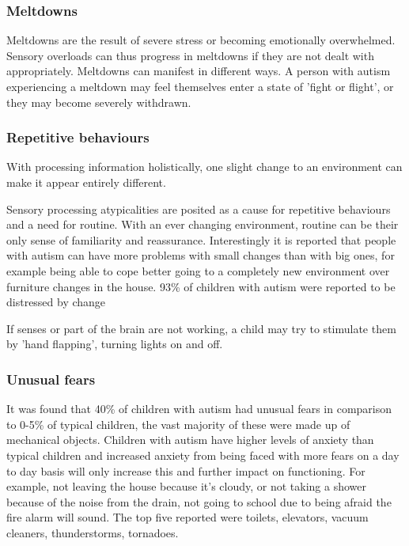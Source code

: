 \documentclass[11pt]{report}
\begin{document}
\subsubsection{Meltdowns}
Meltdowns are the result of severe stress or becoming emotionally overwhelmed. Sensory overloads can thus progress in meltdowns if they are not dealt with appropriately. Meltdowns can manifest in different ways. A person with autism experiencing a meltdown may feel themselves enter a state of 'fight or flight', or they may become severely withdrawn.

\subsubsection{Repetitive behaviours}

With processing information holistically, one slight change to an environment can make it appear entirely different.

Sensory processing atypicalities are posited as a cause for repetitive behaviours and a need for routine. With an ever changing environment, routine can be their only sense of familiarity and reassurance. Interestingly it is reported that people with autism can have more problems with small changes than with big ones, for example being able to cope better going to a completely new environment over furniture changes in the house\cite{olgab}. 93\% of children with autism were reported to be distressed by change \cite{fears}   

If senses or part of the brain are not working, a child may try to stimulate them by 'hand flapping', turning lights on and off.

\subsubsection{Unusual fears}
It was found that 40\% of children with autism had unusual fears in comparison to 0-5\% of typical children, the vast majority of these were made up of mechanical objects. Children with autism have higher levels of anxiety than typical children\cite{fears} and increased anxiety from being faced with more fears on a day to day basis will only increase this and further impact on functioning. For example, not leaving the house because it's cloudy, or not taking a shower because of the noise from the drain, not going to school due to being afraid the fire alarm will sound. The top five reported were toilets, elevators, vacuum cleaners, thunderstorms, tornadoes\cite{fears}.
\end{document}
